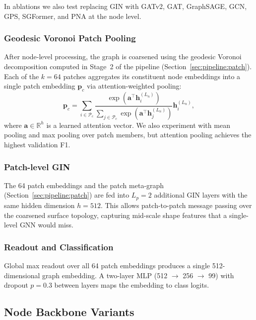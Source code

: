 In ablations we also test replacing GIN with GATv2, GAT, GraphSAGE, GCN, GPS,
SGFormer, and PNA at the node level.

\subsubsection{Geodesic Voronoi Patch Pooling}
\label{sec:arch:pool}

After node-level processing, the graph is coarsened using the geodesic Voronoi
decomposition computed in Stage~2 of the pipeline
(Section~\ref{sec:pipeline:patch}).
Each of the $k = 64$ patches aggregates its constituent node embeddings into a
single patch embedding $\mathbf{p}_c$ via attention-weighted pooling:
\begin{equation}
  \mathbf{p}_c = \sum_{i \in \mathcal{P}_c}
  \frac{\exp\!\left(\mathbf{a}^\top \mathbf{h}_i^{(L_n)}\right)}
       {\sum_{j \in \mathcal{P}_c} \exp\!\left(\mathbf{a}^\top \mathbf{h}_j^{(L_n)}\right)}
  \mathbf{h}_i^{(L_n)},
  \label{eq:attn_pool}
\end{equation}
where $\mathbf{a} \in \mathbb{R}^h$ is a learned attention vector.
We also experiment with mean pooling and max pooling over patch members, but
attention pooling achieves the highest validation F1.

\subsubsection{Patch-level GIN}

The 64 patch embeddings and the patch meta-graph (Section~\ref{sec:pipeline:patch})
are fed into $L_p = 2$ additional GIN layers with the same hidden dimension $h = 512$.
This allows patch-to-patch message passing over the coarsened surface topology,
capturing mid-scale shape features that a single-level GNN would miss.

\subsubsection{Readout and Classification}

Global max readout over all 64 patch embeddings produces a single
512-dimensional graph embedding.
A two-layer MLP (512 $\to$ 256 $\to$ 99) with dropout $p = 0.3$ between
layers maps the embedding to class logits.

\subsection{Node Backbone Variants}

